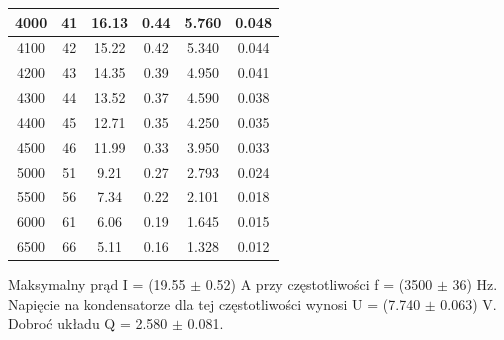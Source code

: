 \documentclass[12pt, a4paper, oneside]{article}
\begin{document}
\begin{table}[h]
\begin{tabular}{|c|c|c|c|c|c|}
    4000 & 41 & 16.13 & 0.44 & 5.760 & 0.048 \\\hline
    4100 & 42 & 15.22 & 0.42 & 5.340 & 0.044 \\\hline
    4200 & 43 & 14.35 & 0.39 & 4.950 & 0.041 \\\hline
    4300 & 44 & 13.52 & 0.37 & 4.590 & 0.038 \\\hline
    4400 & 45 & 12.71 & 0.35 & 4.250 & 0.035 \\\hline
    4500 & 46 & 11.99 & 0.33 & 3.950 & 0.033 \\\hline
    5000 & 51 & 9.21 & 0.27 & 2.793 & 0.024 \\\hline
    5500 & 56 & 7.34 & 0.22 & 2.101 & 0.018 \\\hline
    6000 & 61 & 6.06 & 0.19 & 1.645 & 0.015 \\\hline
    6500 & 66 & 5.11 & 0.16 & 1.328 & 0.012 \\\hline
    \end{tabular}%
  \label{tab:addlabel}%
\end{table}%
\begin{center}
Maksymalny prąd I = (19.55 $\pm$ 0.52) A przy częstotliwości f = (3500 $\pm$ 36) Hz.\\
Napięcie na kondensatorze dla tej częstotliwości wynosi U = (7.740 $\pm$ 0.063) V.\\
Dobroć układu Q = 2.580 $\pm$ 0.081.
\end{center}
\clearpage
\end{document}
